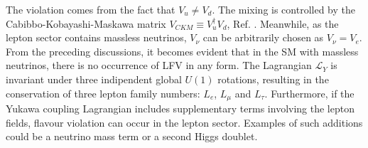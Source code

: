 The violation comes from the fact that $V_u \neq V_d$. The mixing is controlled by the Cabibbo-Kobayashi-Maskawa matrix $V_{CKM}\equiv V^{\dagger}_u V_d $, Ref. \cite{PhysRevLett.10.531}. Meanwhile, as the lepton sector contains massless neutrinos, $V_{\nu}$ can be arbitrarily chosen as $V_{\nu}=V_e$. From the preceding discussions, it becomes evident that in the SM with massless neutrinos, there is no occurrence of LFV in any form. The Lagrangian $\mathscr{L}_Y$ is invariant under three indipendent global $U(1)$ rotations, resulting in the conservation of three lepton family numbers: $L_e$, $L_\mu$ and $L_\tau$. Furthermore, if the Yukawa coupling Lagrangian includes supplementary terms involving the lepton fields, flavour violation can occur in the lepton sector. Examples of such additions could be a neutrino mass term or a second Higgs doublet.

